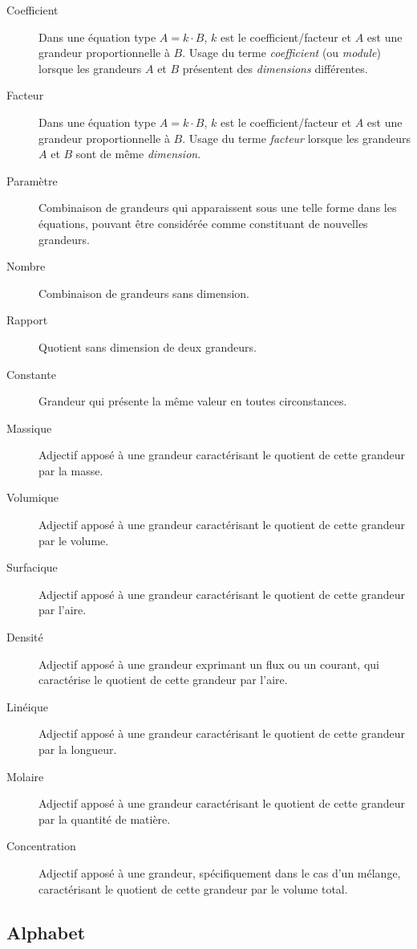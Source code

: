 \documentclass[a4paper, 11pt, twoside, fleqn]{memoir}
\begin{document}
\begin{description}
\item[Coefficient] Dans une équation type $A=k \cdot B$, $k$ est le coefficient/facteur et $A$ est une grandeur proportionnelle à $B$. Usage du terme \emph{coefficient} (ou \emph{module}) lorsque les grandeurs $A$ et $B$ présentent des \emph{dimensions} différentes.
\item[Facteur] Dans une équation type $A=k \cdot B$, $k$ est le coefficient/facteur et $A$ est une grandeur proportionnelle à $B$. Usage du terme \emph{facteur} lorsque les grandeurs $A$ et $B$ sont de même \emph{dimension}.
\item[Paramètre] Combinaison de grandeurs qui apparaissent sous une telle forme dans les équations, pouvant être considérée comme constituant de nouvelles grandeurs.
\item[Nombre] Combinaison de grandeurs sans dimension.
\item[Rapport] Quotient sans dimension de deux grandeurs.
\item[Constante] Grandeur qui présente la même valeur en toutes circonstances.
\item[Massique] Adjectif apposé à une grandeur caractérisant le quotient de cette grandeur par la masse.
\item[Volumique] Adjectif apposé à une grandeur caractérisant le quotient de cette grandeur par le volume.
\item[Surfacique] Adjectif apposé à une grandeur caractérisant le quotient de cette grandeur par l'aire.
\item[Densité] Adjectif apposé à une grandeur exprimant un flux ou un courant, qui caractérise le quotient de cette grandeur par l'aire.
\item[Linéique] Adjectif apposé à une grandeur caractérisant le quotient de cette grandeur par la longueur.
\item[Molaire] Adjectif apposé à une grandeur caractérisant le quotient de cette grandeur par la quantité de matière.
\item[Concentration] Adjectif apposé à une grandeur, spécifiquement dans le cas d'un mélange, caractérisant le quotient de cette grandeur par le volume total.
\end{description}

\subsection{Alphabet}
\end{document}

